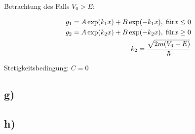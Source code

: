 Betrachtung des Falls $V_0 > E$:

\begin{align*}
    g_1 = A \exp(k_1 x) + B \exp (\-- k_1 x) , \; \text{für} x \leq 0\\
    g_2 = A \exp(k_2 x) + B \exp (\-- k_2 x) , \; \text{für} x \geq 0\\
    k_2 = \frac{\sqrt{2m (V_0-E)}}{\hbar}
\end{align*}

Stetigkeitsbedingung: $C=0$

 

\subsection{g)}



\subsection{h)}





